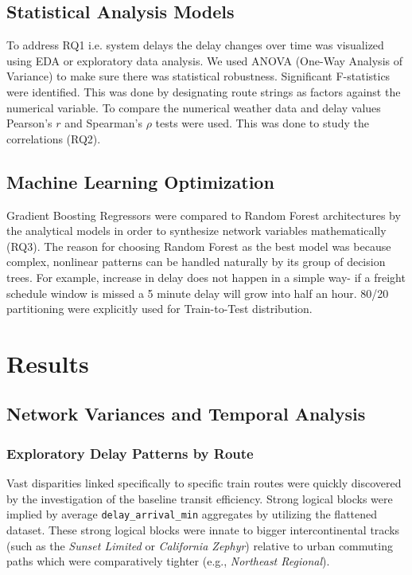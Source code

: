 \documentclass[11pt]{article}
\begin{document}
\subsection{Statistical Analysis Models}
To address RQ1 i.e. system delays the delay changes over time was visualized using EDA or exploratory data analysis. We used ANOVA (One-Way Analysis of Variance) to make sure there was statistical robustness. Significant F-statistics were identified. This was done by designating route strings as factors against the numerical variable. To compare the numerical weather data and delay values Pearson's $r$ and Spearman's  $\rho$ tests were used. This was done to study the correlations (RQ2).

\subsection{Machine Learning Optimization}
Gradient Boosting Regressors were compared to Random Forest architectures by the analytical models in order to synthesize network variables mathematically (RQ3). The reason for choosing Random Forest as the best model was because complex, nonlinear patterns can be handled naturally by its group of decision trees. For example, increase in delay does not happen in a simple way- if a freight schedule window is missed a 5 minute delay will grow into half an hour. 80/20 partitioning were explicitly used for Train-to-Test distribution.


\section{Results}

\subsection{Network Variances and Temporal Analysis}

\subsubsection{Exploratory Delay Patterns by Route}
Vast disparities linked specifically to specific train routes were quickly discovered by the investigation of the baseline transit efficiency. Strong logical blocks were implied by average  \texttt{delay\_arrival\_min} aggregates by utilizing the flattened dataset. These strong logical blocks were innate to bigger intercontinental tracks (such as the \textit{Sunset Limited} or \textit{California Zephyr}) relative to urban commuting paths which were comparatively tighter (e.g., \textit{Northeast Regional}).
\end{document}
